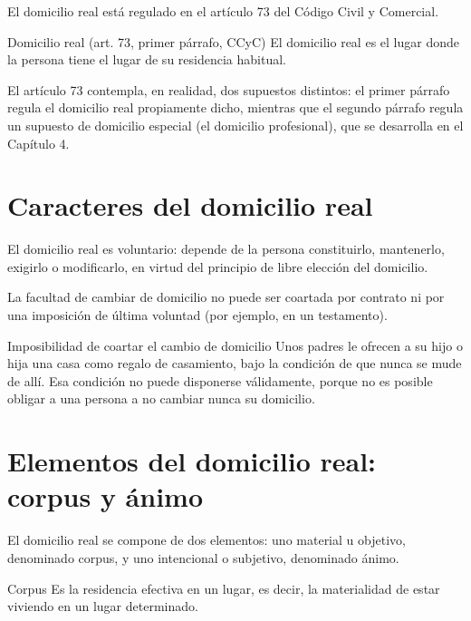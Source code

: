 \documentclass[12pt,oneside]{book}
\begin{document}
El domicilio real está regulado en el artículo 73 del Código Civil y Comercial.

\begin{definition}{Domicilio real (art. 73, primer párrafo, CCyC)}
El domicilio real es el lugar donde la persona tiene el lugar de su residencia habitual.
\end{definition}

El artículo 73 contempla, en realidad, dos supuestos distintos: el primer párrafo regula el domicilio real propiamente dicho, mientras que el segundo párrafo regula un supuesto de domicilio especial (el domicilio profesional), que se desarrolla en el Capítulo 4.

\section{Caracteres del domicilio real}

El domicilio real es voluntario: depende de la persona constituirlo, mantenerlo, exigirlo o modificarlo, en virtud del principio de libre elección del domicilio.

\begin{important}
La facultad de cambiar de domicilio no puede ser coartada por contrato ni por una imposición de última voluntad (por ejemplo, en un testamento).
\end{important}

\begin{example}{Imposibilidad de coartar el cambio de domicilio}
Unos padres le ofrecen a su hijo o hija una casa como regalo de casamiento, bajo la condición de que nunca se mude de allí. Esa condición no puede disponerse válidamente, porque no es posible obligar a una persona a no cambiar nunca su domicilio.
\end{example}

\section{Elementos del domicilio real: corpus y ánimo}

El domicilio real se compone de dos elementos: uno material u objetivo, denominado corpus, y uno intencional o subjetivo, denominado ánimo.

\begin{definition}{Corpus}
Es la residencia efectiva en un lugar, es decir, la materialidad de estar viviendo en un lugar determinado.
\end{definition}
\end{document}
